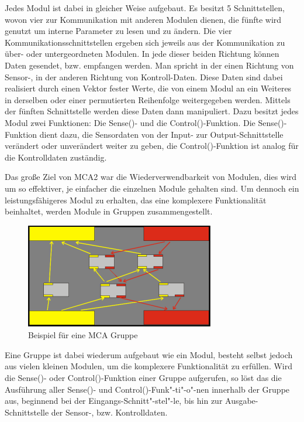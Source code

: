 Jedes Modul ist dabei in gleicher Weise aufgebaut. Es besitzt 5 Schnittstellen, wovon vier zur Kommunikation mit anderen Modulen dienen,
 die fünfte wird genutzt um interne Parameter zu lesen und zu ändern. Die vier Kommunikationsschnittstellen ergeben sich jeweils aus der
 Kommunikation zu über- oder untergeordneten Modulen. In jede dieser beiden Richtung können Daten gesendet, bzw. empfangen werden.
 Man spricht in der einen Richtung von Sensor-, in der anderen Richtung von Kontroll-Daten. Diese Daten sind dabei realisiert durch einen Vektor fester Werte,
 die von einem Modul an ein Weiteres in derselben oder einer permutierten Reihenfolge weitergegeben werden.
 Mittels der fünften Schnittstelle werden diese Daten dann manipuliert. Dazu besitzt jedes Modul zwei Funktionen: Die Sense()- und die Control()-Funktion.
 Die Sense()-Funktion dient dazu, die Sensordaten von der Input- zur Output-Schnittstelle verändert oder unverändert weiter zu geben, die Control()-Funktion ist
 analog für die Kontrolldaten zuständig.

Das große Ziel von MCA2 war die Wiederverwendbarkeit von Modulen, dies wird um so effektiver, je einfacher die einzelnen Module gehalten sind.
 Um dennoch ein leistungsfähigeres Modul zu erhalten, das eine komplexere Funktionalität beinhaltet, werden Module in Gruppen zusammengestellt. 

\begin{figure}[h]
	\center
	\includegraphics[scale=2.0]{graphics/mcagroup.png}
	\caption{\label{fig:MCA-Gruppe} Beispiel für eine MCA Gruppe}
\end{figure}

Eine Gruppe ist dabei wiederum aufgebaut wie ein Modul, besteht selbst jedoch aus vielen kleinen Modulen,
 um die komplexere Funktionalität zu erfüllen. Wird die Sense()- oder Control()-Funktion einer Gruppe aufgerufen,
 so löst das die Ausführung aller Sense()- und Control()-Funk"-ti"-o"-nen
 innerhalb der Gruppe aus, beginnend bei der Eingangs-Schnitt"-stel"-le, bis hin
 zur Ausgabe-Schnittstelle der Sensor-, bzw. Kontrolldaten.

